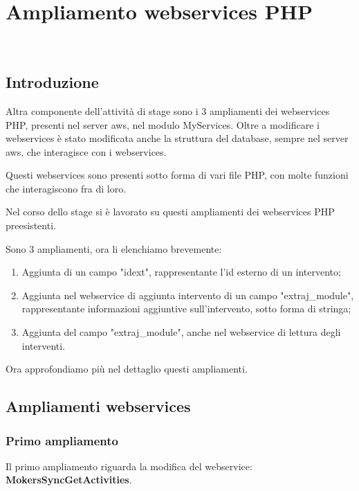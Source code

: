 
\chapter{Ampliamento webservices PHP}
\label{cap:webservices}

\\

\section{Introduzione}
Altra componente dell'attività di stage sono i 3 ampliamenti dei webservices PHP, presenti nel server \gls{aws}, nel modulo MyServices. Oltre a modificare i webservices è stato modificata anche la struttura del database, sempre nel server \gls{aws}, che interagisce con i webservices.

Questi webservices sono presenti sotto forma di vari file PHP, con molte funzioni che interagiscono fra di loro.

Nel corso dello stage si è lavorato su questi ampliamenti dei webservices PHP preesistenti.

Sono 3 ampliamenti, ora li elenchiamo brevemente:
\begin{enumerate}
            \item Aggiunta di un campo "idext", rappresentante l'id esterno di un intervento;
            \item Aggiunta nel webservice di aggiunta intervento di un campo "extraj\_module", rappresentante informazioni aggiuntive sull'intervento, sotto forma di stringa;
            \item Aggiunta del campo "extraj\_module", anche nel webservice di lettura degli interventi.
\end{enumerate}

Ora approfondiamo più nel dettaglio questi ampliamenti.

\newpage

\section{Ampliamenti webservices}
\subsection{Primo ampliamento}
Il primo ampliamento riguarda la modifica del webservice:  \\ \textbf{MokersSyncGetActivities}.


